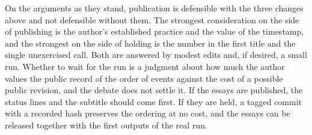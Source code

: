 \documentclass[11pt]{article}
\begin{document}
On the arguments as they stand, publication is defensible with the three changes above and not defensible without them. The strongest consideration on the side of publishing is the author's established practice and the value of the timestamp, and the strongest on the side of holding is the number in the first title and the single unexercised call. Both are answered by modest edits and, if desired, a small run. Whether to wait for the run is a judgment about how much the author values the public record of the order of events against the cost of a possible public revision, and the debate does not settle it. If the essays are published, the status lines and the subtitle should come first. If they are held, a tagged commit with a recorded hash preserves the ordering at no cost, and the essays can be released together with the first outputs of the real run.
\end{document}

